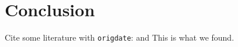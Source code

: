 \documentclass{jcls}
\begin{document}
\section{Conclusion}


Cite some literature with \verb|origdate|: \cite{test,testm} and \autocite{testm}
This is what we found.

%
%
%
\end{document}
